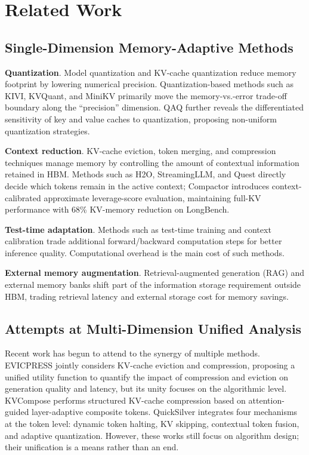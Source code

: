 \documentclass[11pt,a4paper]{article}
\theoremstyle{plain}
\theoremstyle{definition}
\begin{document}
\section{Related Work}

\subsection{Single-Dimension Memory-Adaptive Methods}

\textbf{Quantization}. Model quantization and KV-cache quantization reduce memory footprint by lowering numerical precision. Quantization-based methods such as KIVI, KVQuant, and MiniKV primarily move the memory-vs.-error trade-off boundary along the ``precision'' dimension. QAQ further reveals the differentiated sensitivity of key and value caches to quantization, proposing non-uniform quantization strategies.

\textbf{Context reduction}. KV-cache eviction, token merging, and compression techniques manage memory by controlling the amount of contextual information retained in HBM. Methods such as H2O, StreamingLLM, and Quest directly decide which tokens remain in the active context; Compactor introduces context-calibrated approximate leverage-score evaluation, maintaining full-KV performance with 68\% KV-memory reduction on LongBench.

\textbf{Test-time adaptation}. Methods such as test-time training and context calibration trade additional forward/backward computation steps for better inference quality. Computational overhead is the main cost of such methods.

\textbf{External memory augmentation}. Retrieval-augmented generation (RAG) and external memory banks shift part of the information storage requirement outside HBM, trading retrieval latency and external storage cost for memory savings.

\subsection{Attempts at Multi-Dimension Unified Analysis}

Recent work has begun to attend to the synergy of multiple methods. EVICPRESS jointly considers KV-cache eviction and compression, proposing a unified utility function to quantify the impact of compression and eviction on generation quality and latency, but its unity focuses on the algorithmic level. KVCompose performs structured KV-cache compression based on attention-guided layer-adaptive composite tokens. QuickSilver integrates four mechanisms at the token level: dynamic token halting, KV skipping, contextual token fusion, and adaptive quantization. However, these works still focus on algorithm design; their unification is a means rather than an end.
\end{document}
